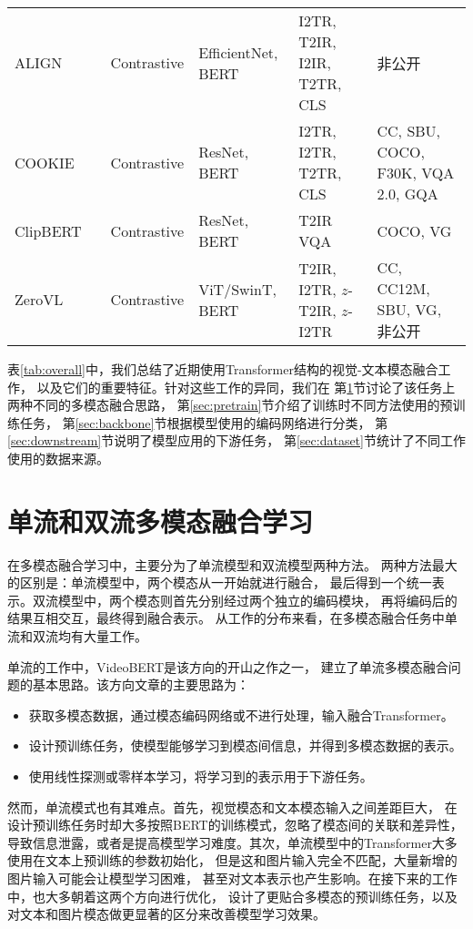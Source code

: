 \begin{sidewaystable}[]
{\begin{tabular}{l|c|l|l|l|l}
ALIGN\cite{align} &  & Contrastive & EfficientNet, BERT & I2TR, T2IR, I2IR, T2TR, CLS & 非公开 \\
COOKIE\cite{cookie} &  & Contrastive & ResNet, BERT & I2TR, I2TR, T2TR, CLS & CC, SBU, COCO, F30K, VQA 2.0, GQA \\
ClipBERT\cite{clipbert} &  & Contrastive & ResNet, BERT & T2IR VQA & COCO, VG \\
ZeroVL\cite{zerovl} &  & Contrastive & ViT/SwinT, BERT & T2IR, I2TR, $z$-T2IR, $z$-I2TR & CC, CC12M, SBU, VG, 非公开 \\ \hline
\end{tabular}%
}
\caption{近期基于Transformer的视觉-文本模态融合工作}
\label{tab:overall}
\end{sidewaystable}

表\ref{tab:overall}中，我们总结了近期使用Transformer结构的视觉-文本模态融合工作，
以及它们的重要特征。针对这些工作的异同，我们在
第\ref{sec:singledouble}节讨论了该任务上两种不同的多模态融合思路，
第\ref{sec:pretrain}节介绍了训练时不同方法使用的预训练任务，
第\ref{sec:backbone}节根据模型使用的编码网络进行分类，
第\ref{sec:downstream}节说明了模型应用的下游任务，
第\ref{sec:dataset}节统计了不同工作使用的数据来源。

\section{单流和双流多模态融合学习}\label{sec:singledouble}

在多模态融合学习中，主要分为了单流模型和双流模型两种方法。
两种方法最大的区别是：单流模型中，两个模态从一开始就进行融合，
最后得到一个统一表示。双流模型中，两个模态则首先分别经过两个独立的编码模块，
再将编码后的结果互相交互，最终得到融合表示。
从工作的分布来看，在多模态融合任务中单流和双流均有大量工作。

单流的工作中，VideoBERT\cite{videobert}是该方向的开山之作之一，
建立了单流多模态融合问题的基本思路。该方向文章的主要思路为：

\begin{itemize}
    \item 获取多模态数据，通过模态编码网络或不进行处理，输入融合Transformer。
    \item 设计预训练任务，使模型能够学习到模态间信息，并得到多模态数据的表示。
    \item 使用线性探测或零样本学习，将学习到的表示用于下游任务。
\end{itemize}

然而，单流模式也有其难点。首先，视觉模态和文本模态输入之间差距巨大，
在设计预训练任务时却大多按照BERT的训练模式，忽略了模态间的关联和差异性，
导致信息泄露，或者是提高模型学习难度。其次，单流模型中的Transformer大多使用在文本上预训练的参数初始化，
但是这和图片输入完全不匹配，大量新增的图片输入可能会让模型学习困难，
甚至对文本表示也产生影响。在接下来的工作中，也大多朝着这两个方向进行优化，
设计了更贴合多模态的预训练任务，以及对文本和图片模态做更显著的区分来改善模型学习效果。

